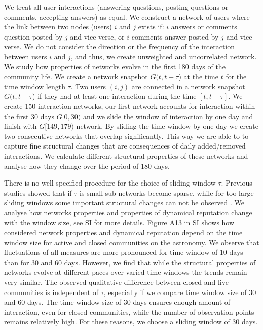We treat all user interactions (answering questions, posting questions or comments, accepting answers) as equal. We construct a network of users where the link between two nodes (users) $i$ and $j$ exists if: $i$ answers or comments question posted by $j$ and vice verse, or $i$ comments answer posted by $j$ and vice verse. We do not consider the direction or the frequency of the interaction between users $i$ and $j$, and thus, we create unweighted and uncorrelated network. 
We study how properties of networks evolve in the first 180 days of the community life. We create a network snapshot $G(t, t+\tau$) at the time $t$ for the time window length $\tau$. Two users $(i, j)$ are connected in a network snapshot $G(t, t+\tau$) if they had at least one interaction during the time $[t,t+\tau]$. We create 150 interaction networks, our first network accounts for interaction within the first 30 days $G[0,30)$ and we slide the window of interaction by one day and finish with $G[149,179)$ network. By sliding the time window by one day we create two consecutive networks that overlap significantly. This way we are able to to capture fine structural changes that are consequences of daily added/removed interactions. We calculate different structural properties of these networks and analyse how they change over the period of 180 days.  


There is no well-specified procedure for the choice of sliding window $\tau$. Previous studies showed that if $\tau$ is small sub networks become sparse, while for too large sliding windows some important structural changes can not be observed \cite{krings2012effects, arnold2021moving}. We analyse how networks properties and properties of dynamical reputation change with the window size, see SI for more details. Figure A13 in SI shows how considered network properties and dynamical reputation depend on the time window size for active and closed communities on the astronomy. We observe that fluctuations of all measures are more pronounced for time window of 10 days than for 30 and 60 days. However, we find that while the structural properties of networks evolve at different paces over varied time windows the trends remain very similar. The observed qualitative difference between closed and live communities is independent of $\tau$, especially if we compare time window size of 30 and 60 days. The time window size of 30 days ensures enough amount of interaction, even for closed communities, while the number of observation points remains relatively high. For these reasons, we choose a sliding window of 30 days. 

